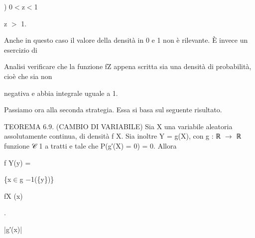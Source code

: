 \documentclass[a4paper,portrait,12pt]{article}
\begin{document}
\begin{flushleft}
) 0$<$z$<$1
\end{flushleft}


\begin{flushleft}
z $>$ 1.
\end{flushleft}





\begin{flushleft}
Anche in questo caso il valore della densit\`{a} in 0 e 1 non \`{e} rilevante. \`{E} invece un esercizio di
\end{flushleft}


\begin{flushleft}
Analisi verificare che la funzione fZ appena scritta sia una densit\`{a} di probabilit\`{a}, cio\`{e} che sia non
\end{flushleft}


\begin{flushleft}
negativa e abbia integrale uguale a 1.
\end{flushleft}


\begin{flushleft}
Passiamo ora alla seconda strategia. Essa si basa sul seguente risultato.
\end{flushleft}


\begin{flushleft}
TEOREMA 6.9. (CAMBIO DI VARIABILE) Sia X una variabile aleatoria assolutamente continua, di densit\`{a} f X. Sia inoltre Y = g(X), con g : ℝ $\rightarrow$ ℝ funzione 𝒞 1 a tratti e tale che P(g′(X) = 0) = 0. Allora
\end{flushleft}


\begin{flushleft}
f Y(y) =
\end{flushleft}


\begin{flushleft}
\{x$\in$g $-$1(\{y\})\}
\end{flushleft}





\begin{flushleft}
fX (x)
\end{flushleft}


.


\begin{flushleft}
|g′(x)|
\end{flushleft}
\end{document}
